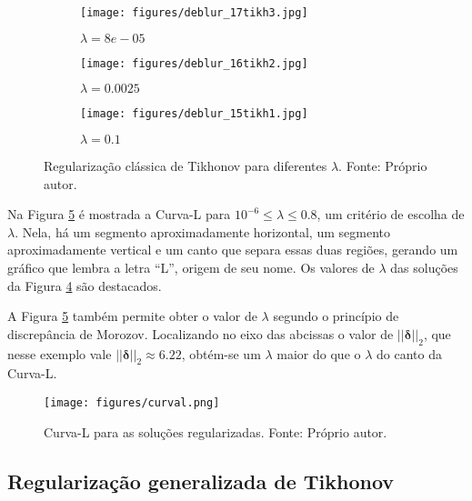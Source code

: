 \begin{figure}[H]
     \centering
     \begin{subfigure}[b]{0.32\textwidth}
         \centering
         \texttt{[image: figures/deblur\_17tikh3.jpg]}
         \caption{$\lambda = 8e-05$}
         \label{fig:01_012a}
     \end{subfigure}
     \hfill
     \begin{subfigure}[b]{0.32\textwidth}
         \centering
                  \texttt{[image: figures/deblur\_16tikh2.jpg]}
         \caption{$\lambda = 0.0025$}
         \label{fig:01_012b}
     \end{subfigure}
          \hfill
     \begin{subfigure}[b]{0.32\textwidth}
         \centering
                  \texttt{[image: figures/deblur\_15tikh1.jpg]}
         \caption{$\lambda = 0.1$}
         \label{fig:01_012c}
     \end{subfigure}
\caption[Regularização clássica de Tikhonov para diferentes valores de $\lambda$.]{Regularização clássica de Tikhonov para diferentes $\lambda$. Fonte: Próprio autor.}
\label{fig:01_012}
\end{figure}

Na Figura \ref{fig:01_016} é mostrada a Curva-L para $10^{-6} \leq \lambda \leq 0.8$, um critério de escolha de $\lambda$. Nela, há um segmento aproximadamente horizontal, um segmento aproximadamente vertical e um canto que separa essas duas regiões, gerando um gráfico que lembra a letra ``L'', origem de seu nome.  Os valores de $\lambda$ das soluções da Figura \ref{fig:01_012} são destacados. 

A Figura \ref{fig:01_016} também permite obter o valor de $\lambda$ segundo o princípio de discrepância de Morozov. Localizando no eixo das abcissas o valor de $\vert \vert \bm{\delta} \vert \vert_2$, que nesse exemplo vale $\vert \vert \bm{\delta} \vert \vert_2 \approx 6.22$, obtém-se um $ \lambda$ maior do que o $\lambda$ do canto da Curva-L.

\begin{figure}[H]
\centering
\texttt{[image: figures/curval.png]} 
\caption[Curva-L para as soluções regularizadas.]{Curva-L para as soluções regularizadas. Fonte: Próprio autor.}
\label{fig:01_016}
\end{figure}






\subsection{Regularização generalizada de Tikhonov} 

